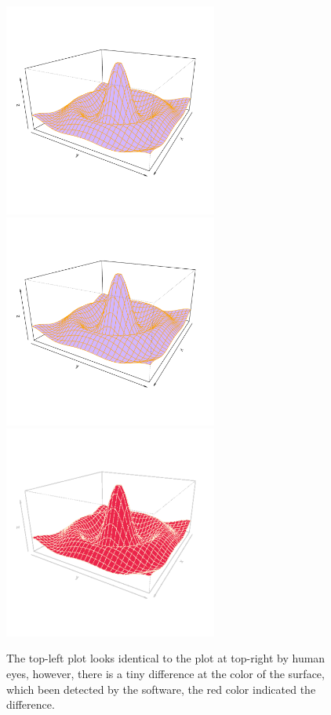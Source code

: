 \documentclass[paper=a4, fontsize=11pt]{report}
\begin{document}
\begin{figure}[h]
\begin{center}
  \includegraphics[height = 7cm, width = 7cm]{figure/Chapter5_example_01.pdf}
  \includegraphics[height = 7cm, width = 7cm]{figure/Chapter5_example_02.pdf}
  \includegraphics[height = 7cm, width = 7cm]{figure/Chapter5_example_03.pdf}

  \caption{The top-left plot looks identical to the plot at top-right by human eyes, however, there is a tiny difference at the color of the surface, which been detected by the software, the red color indicated the difference.}
  	\label{chapter5.1}
\end{center}
\end{figure}
\end{document}
